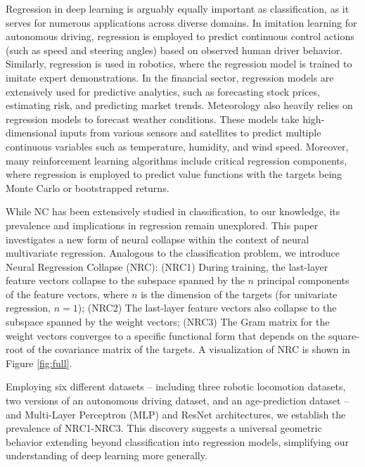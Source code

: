 \documentclass{article}
\theoremstyle{plain}
\theoremstyle{definition}
\theoremstyle{remark}
\begin{document}
Regression in deep learning is arguably equally important as classification, as it serves for numerous applications across diverse domains. In imitation learning for autonomous driving, regression is employed to predict continuous control actions (such as speed and steering angles) based on observed human driver behavior. Similarly, regression is used in robotics, where the regression model is trained to imitate expert demonstrations. 
In the financial sector, regression models are extensively used for predictive analytics, such as forecasting stock prices, estimating risk, and predicting market trends. 
Meteorology also heavily relies on regression models to forecast weather conditions. These models take high-dimensional inputs from various sensors and satellites to predict multiple continuous variables such as temperature, humidity, and wind speed. Moreover, many reinforcement learning algorithms include critical regression components, where regression is employed to predict value functions with the targets being Monte Carlo or bootstrapped returns. 

While NC has been extensively studied in classification, to our knowledge, its prevalence and implications in regression remain unexplored.  This paper investigates a new form of neural collapse within the context of neural multivariate regression. Analogous to the classification problem, we introduce Neural Regression Collapse (NRC):  (NRC1) During training, the last-layer feature vectors collapse to the subspace spanned by the $n$ principal components of the feature vectors, where $n$ is the dimension of the targets (for univariate regression, $n=1$); (NRC2) The last-layer feature vectors also collapse to the subspace spanned by the weight vectors; (NRC3) The Gram matrix for the weight vectors converges to a specific functional form that depends on the square-root of the covariance matrix of the targets. A visualization of NRC is shown in Figure \ref{fig:full}. 

Employing six different datasets -- including three robotic locomotion datasets, two versions of an autonomous driving dataset, and an age-prediction dataset -- and Multi-Layer Perceptron (MLP) and ResNet architectures, we establish the prevalence of NRC1-NRC3. 
This discovery suggests a universal geometric behavior extending beyond classification into regression models, simplifying our understanding of deep learning more generally.
\end{document}
